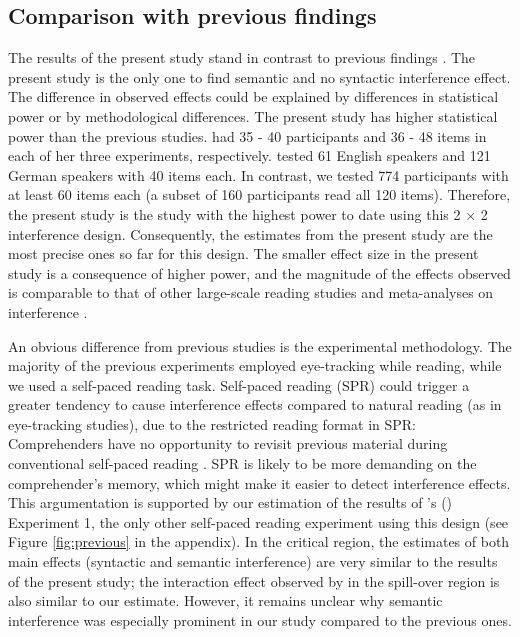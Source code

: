\documentclass[a4paper, man, floatsintext]{apa7}
\begin{document}
\subsection{Comparison with previous findings}
The results of the present study stand in contrast to previous findings \citep{vandyke07, mertzen}. The present study is the only one to find semantic and no syntactic interference effect. The difference in observed effects could be explained by differences in statistical power or by methodological differences. The present study has higher statistical power than the previous studies. \citet{vandyke07} had 35 - 40 participants and 36 - 48 items in each of her three experiments, respectively. \cite{mertzen} tested 61 English speakers and 121 German speakers with 40 items each. In contrast, we tested 774 participants with at least 60 items each (a subset of 160 participants read all 120 items). Therefore, the present study is the study with the highest power to date using this 2 $\times$ 2 interference design. Consequently, the estimates from the present study are the most precise ones so far for this design. The smaller effect size in the present study is a consequence of higher power, and the magnitude of the effects observed is comparable to that of other large-scale reading studies \citep{nicenboim} and meta-analyses on interference \citep{jaeger_etal_2017}.

An obvious difference from previous studies is the experimental methodology. The majority of the previous experiments employed eye-tracking while reading, while we used a self-paced reading task. Self-paced reading (SPR) could trigger a greater tendency to cause interference effects compared to natural reading (as in eye-tracking studies), due to the restricted reading format in SPR: Comprehenders have no opportunity to revisit previous material during conventional self-paced reading  \citep[but see][]{BSPR}. SPR is likely to be more demanding on the comprehender's memory, which might make it easier to detect interference effects. This argumentation is supported by our estimation of the results of \citeauthor{vandyke07}'s (\citeyear{vandyke07}) Experiment 1, the only other self-paced reading experiment using this design (see Figure \ref{fig:previous} in the appendix).  In the critical region, the estimates of both main effects (syntactic and semantic interference) are very similar to the results of the present study; the interaction effect observed by  \citeauthor{vandyke07} in the spill-over region is also similar to our estimate. However, it remains unclear why semantic interference was especially prominent in our study compared to the previous ones.
\end{document}
